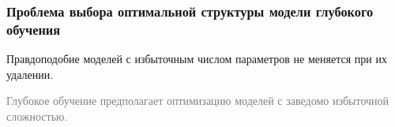 \documentclass[usenames,dvipsnames,11pt,pdf,utf8,russian,aspectratio=43]{beamer}
\begin{document}
\begin{frame}    
                                                                                                                        
\frametitle{Проблема выбора оптимальной структуры модели глубокого обучения}                                                                                                          
Правдоподобие моделей с избыточным числом параметров не меняется при их удалении.                                                       
\begin{figure}[h]                                                                                                                               
\centering                                                                                                                                      
\hspace*{-1cm}                                       
\end{figure}                                                                                                   
\textcolor{gray}{Глубокое обучение предполагает оптимизацию моделей с заведомо избыточной сложностью.}  

                                                                                                                                             
\end{frame}    
\end{document}
